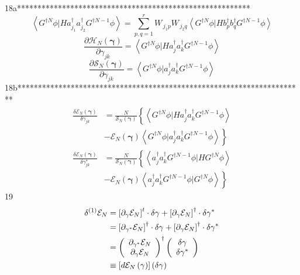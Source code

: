 \documentclass[aps,preprint]{revtex4}%
\begin{document}
18a*********************************************************%
\[
\left\langle G^{\dagger N}\phi|Ha_{j_{1}}^{\dagger}a_{j_{2}}^{\dagger
}G^{\dagger N-1}\phi\right\rangle =\sum_{p,q=1}^{r}W_{\,j_{1}p}W_{\,j_{2}%
q}\left\langle G^{\dagger N}\phi|Hb_{p}^{\dagger}b_{q}^{\dagger}G^{\dagger
N-1}\phi\right\rangle
\]%
\[
\frac{\partial\mathcal{H}_{N}\left(  \mathbf{\gamma}\right)  }{\partial
\gamma_{jk}}=\left\langle G^{\dagger N}\phi|Ha_{j}^{\dagger}a_{k}^{\dagger
}G^{\dagger N-1}\phi\right\rangle
\]%
\[
\frac{\partial\mathcal{S}_{N}\left(  \mathbf{\gamma}\right)  }{\partial
\gamma_{jk}}=\left\langle G^{\dagger N}\phi|a_{j}^{\dagger}a_{k}^{\dagger
}G^{\dagger N-1}\phi\right\rangle
\]
18b**********************************************************************%
\begin{align*}
\frac{\delta\mathcal{E}_{N}\left(  \mathbf{\gamma}\right)  }{\delta\gamma
_{jk}}  &  =\frac{N}{\mathcal{S}_{N}\left(  \mathbf{\gamma}\right)  }\left\{
\left\langle G^{\dagger N}\phi|Ha_{j}^{\dagger}a_{k}^{\dagger}G^{\dagger
N-1}\phi\right\rangle \right. \\
&  \left.  -\mathcal{E}_{N}\left(  \mathbf{\gamma}\right)  \left\langle
G^{\dagger N}\phi|a_{j}^{\dagger}a_{k}^{\dagger}G^{\dagger N-1}\phi
\right\rangle \right\} \\
\frac{\delta\mathcal{E}_{N}\left(  \mathbf{\gamma}\right)  }{\delta\gamma
_{jk}^{\ast}}  &  =\frac{N}{\mathcal{S}_{N}\left(  \mathbf{\gamma}\right)
}\left\{  \left\langle a_{j}^{\dagger}a_{k}^{\dagger}G^{\dagger N-1}%
\phi|HG^{\dagger N}\phi\right\rangle \right. \\
&  \left.  -\mathcal{E}_{N}\left(  \mathbf{\gamma}\right)  \left\langle
a_{j}^{\dagger}a_{k}^{\dagger}G^{\dagger N-1}\phi|G^{\dagger N}\phi
\right\rangle \right\}
\end{align*}
19%
\begin{align*}
\delta^{\left(  1\right)  }\mathcal{E}_{N}  &  =\left[  \partial_{\gamma
}\mathcal{E}_{N}\right]  ^{t}\cdot\delta\mathbf{\gamma}+\left[  \partial
_{\gamma}\mathcal{E}_{N}\right]  ^{\dagger}\cdot\delta\mathbf{\gamma}^{\ast}\\
&  =\left[  \partial_{\gamma^{\ast}}\mathcal{E}_{N}\right]  ^{\dagger}%
\cdot\delta\mathbf{\gamma}+\left[  \partial_{\gamma}\mathcal{E}_{N}\right]
^{\dagger}\cdot\delta\mathbf{\gamma}^{\ast}\\
&  =\left(
\begin{array}
[c]{c}%
\partial_{\gamma^{\ast}}\mathcal{E}_{N}\\
\partial_{\gamma}\mathcal{E}_{N}%
\end{array}
\right)  ^{\dagger}\left(
\begin{array}
[c]{c}%
\delta\mathbf{\gamma}\\
\delta\mathbf{\gamma}^{\ast}%
\end{array}
\right) \\
&  \equiv\left[  d\mathcal{E}_{N}\left(  \mathbf{\gamma}\right)  \right]
\left(  \delta\mathbf{\gamma}\right)
\end{align*}%
\end{document}
